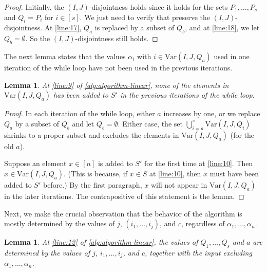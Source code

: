 \documentclass[11pt]{article}
\theoremstyle{plain}
\newtheorem{lemma}[thm]{Lemma}
\theoremstyle{definition}
\theoremstyle{remark}
\newcommand{\var}{\mathrm{Var}}
\begin{document}
\begin{proof}
Initially, the $(I,J)$-disjointness holds since it holds for the sets $P_1,\dots,P_s$ and $Q_i=P_i$ for $i\in [s]$.
We just need to verify that  preserve the $(I,J)$-disjointness.
At \cref{line:17}, $Q_a$ is replaced by a subset of $Q_b$, and at \cref{line:18}, we let $Q_b=\emptyset$. So the $(I,J)$-disjointness still holds.
\end{proof}

The next lemma states that the
values $\alpha_i$ with $i\in\var(I,J,Q_a)$ used in one iteration of the while loop have not been used in the previous iterations.

\begin{lemma}\label{lem:new-elements}
At \cref{line:9} of \cref{alg:algorithm-linear}, none of the elements in $\var(I,J,Q_a)$ has been added to $S'$ in the previous iterations of the while loop.
\end{lemma}

\begin{proof}
In each iteration of the while loop, either $a$ increases by one, or we replace $Q_a$ by a subset of $Q_b$ and let $Q_b=\emptyset$. Either case, the set $\bigcup_{i=a}^{s} \var(I,J,Q_i)$ shrinks to a proper subset and excludes the elements in $\var(I,J,Q_a)$ (for the old $a$). 

Suppose an element $x\in [n]$ is added to $S'$ for the first time at \cref{line:10}. Then $x\in \var(I,J,Q_a)$. (This is because, if $x\in S$ at \cref{line:10}, then $x$ must have been added to $S'$ before.) 
By the first paragraph, $x$ will not appear in $\var(I,J,Q_a)$ in the later iterations. The contrapositive of this statement is the lemma.
\end{proof}

Next, we make the crucial observation that the behavior of the algorithm is mostly determined by the values of $j$, $(i_1,\dots,i_j)$, and $c$, regardless of $\alpha_1,\dots,\alpha_n$. 

\begin{lemma}\label{lem:determined}
At \cref{line:12} of \cref{alg:algorithm-linear}, the values of $Q_1,\dots,Q_s$ and $a$ are determined by the values of $j$, $i_1,\dots,i_j$, and $c$, together with the input excluding $\alpha_1,\dots,\alpha_n$. 
\end{lemma}
\end{document}
